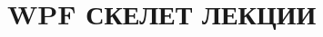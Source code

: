 \documentclass[a4paper,14pt]{extarticle}
\begin{document}
\section{WPF СКЕЛЕТ ЛЕКЦИИ}
\end{document}
